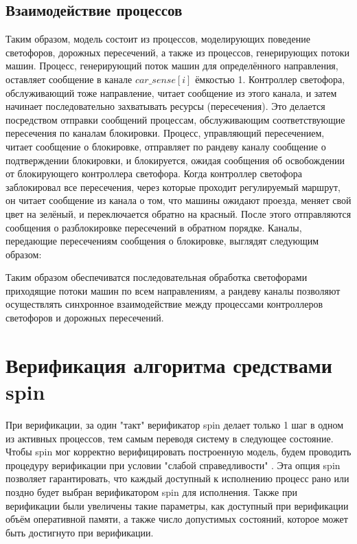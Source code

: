 \documentclass[a4papaer,12pt]{article}
\begin{document}
\subsection{Взаимодействие процессов}

Таким образом, модель состоит из процессов, моделирующих поведение светофоров, дорожных пересечений, а также из процессов, генерирующих потоки машин. Процесс, генерирующий поток машин для определённого направления, оставляет сообщение в канале $car\_sense[i]$ ёмкостью 1. Контроллер светофора, обслуживающий тоже направление, читает сообщение из этого канала, и затем начинает последовательно захватывать ресурсы (пересечения). Это делается посредством отправки сообщений процессам, обслуживающим соответствующие пересечения по каналам блокировки. Процесс, управляющий пересечением, читает сообщение о блокировке, отправляет
по рандеву каналу сообщение о подтверждении блокировки, и блокируется, ожидая сообщения 
об освобождении от блокирующего контроллера светофора. Когда контроллер светофора заблокировал все пересечения, через которые проходит регулируемый маршрут, 
он читает сообщение из канала о том, что машины ожидают проезда, меняет свой цвет на зелёный, и переключается обратно на красный. После этого отправляются сообщения о разблокировке пересечений в обратном порядке. Каналы, передающие пересечениям сообщения о блокировке, выглядят следующим образом:



Таким образом обеспечиватся последовательная обработка светофорами приходящие потоки машин по 
всем направлениям, а рандеву каналы позволяют осуществлять синхронное взаимодействие между 
процессами контроллеров светофоров и дорожных пересечений.

\section{Верификация алгоритма средствами spin}

При верификации, за один "такт" верификатор spin делает только 1 шаг в одном из активных процессов, тем
самым переводя систему в следующее состояние. Чтобы spin мог корректно верифицировать построенную модель,
будем проводить процедуру верификации при условии "слабой справедливости" \quad \cite{WeakFairness}. Эта опция spin
позволяет гарантировать, что каждый доступный к исполнению процесс рано или поздно будет
выбран верификатором spin для исполнения. Также при верификации были увеличены такие параметры, как доступный
 при верификации объём оперативной памяти, а также число допустимых
состояний, которое может быть достигнуто при верификации.
\end{document}
